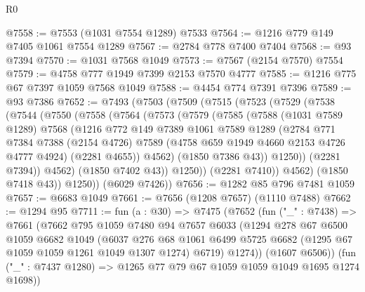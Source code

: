 \begin{lexlean}{R0}
\begin{coremodule}
@7558 := @7553 (@1031 @7554 @1289) @7533
@7564 := @1216 @779 @149 @7405 @1061 @7554 @1289
@7567 := @2784 @778 @7400 @7404
@7568 := @93 @7394
@7570 := @1031 @7568 @1049
@7573 := @7567 (@2154 @7570) @7554
@7579 := @4758 @777 @1949 @7399 @2153 @7570 @4777
@7585 := @1216 @775 @67 @7397 @1059 @7568 @1049
@7588 := @4454 @774 @7391 @7396
@7589 := @93 @7386
@7652 := @7493
    (@7503
      (@7509
        (@7515
          (@7523
            (@7529
              (@7538
                (@7544
                  (@7550
                    (@7558
                      (@7564
                        (@7573
                          (@7579
                            (@7585
                              (@7588
                                (@1031 @7589 @1289)
                                @7568
                                (@1216
                                  @772
                                  @149
                                  @7389
                                  @1061
                                  @7589
                                  @1289
                                  (@2784
                                    @771
                                    @7384
                                    @7388
                                    (@2154 @4726)
                                    @7589
                                    (@4758 @659 @1949 @4660 @2153 @4726 @4777 @4924)
                                    (@2281 @4655))
                                  @4562)
                                (@1850 @7386 @43))
                              @1250))
                          (@2281 @7394))
                        @4562)
                      (@1850 @7402 @43))
                    @1250))
                (@2281 @7410))
              @4562)
            (@1850 @7418 @43))
          @1250))
      (@6029 @7426))
@7656 := @1282 @85 @796 @7481 @1059
@7657 := @6683 @1049
@7661 := @7656 (@1208 @7657) (@1110 @7488)
@7662 := @1294 @95
@7711 := fun (a : @30) =>
  @7475
    (@7652
      (fun ("_" : @7438) =>
      @7661
        (@7662
          @795
          @1059
          @7480
          @94
          @7657
          @6033
          (@1294
            @278
            @67
            @6500
            @1059
            @6682
            @1049
            (@6037
              @276
              @68
              @1061
              @6499
              @5725
              @6682
              (@1295 @67 @1059 @1059 @1261 @1049 @1307 @1274)
              @6719)
            @1274))
        (@1607 @6506))
      (fun ("_" : @7437 @1280) => @1265 @77 @79 @67 @1059 @1059 @1049 @1695 @1274 @1698))

\end{coremodule}
\end{lexlean}
